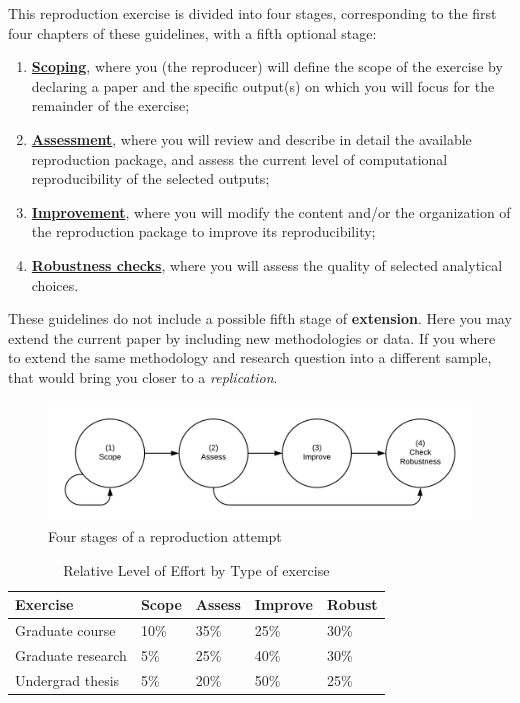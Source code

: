 \documentclass[]{book}
\providecommand{\tightlist}{%
  \setlength{\itemsep}{0pt}\setlength{\parskip}{0pt}}
\begin{document}
This reproduction exercise is divided into four stages, corresponding to the first four chapters of these guidelines, with a fifth optional stage:

\begin{enumerate}
\def\labelenumi{\arabic{enumi}.}
\tightlist
\item
  \protect\hyperlink{scoping}{\textbf{Scoping}}, where you (the reproducer) will define the scope of the exercise by declaring a paper and the specific output(s) on which you will focus for the remainder of the exercise;\\
\item
  \protect\hyperlink{assessment}{\textbf{Assessment}}, where you will review and describe in detail the available reproduction package, and assess the current level of computational reproducibility of the selected outputs;
\item
  \protect\hyperlink{improvements}{\textbf{Improvement}}, where you will modify the content and/or the organization of the reproduction package to improve its reproducibility;\\
\item
  \protect\hyperlink{robust}{\textbf{Robustness checks}}, where you will assess the quality of selected analytical choices.
\end{enumerate}

These guidelines do not include a possible fifth stage of \textbf{extension}. Here you may extend the current paper by including new methodologies or data. If you where to extend the same methodology and research question into a different sample, that would bring you closer to a \emph{replication}.

\begin{figure}
\includegraphics[width=1\linewidth]{stages} \caption{Four stages of a reproduction attempt}\label{fig:stages-intro}
\end{figure}
\begin{table}

\caption{\label{tab:stages-intro}Relative Level of Effort by Type of exercise}
\centering
\begin{tabu} to 
\hline
Exercise & Scope & Assess & Improve & Robust\\
\hline
Graduate course & 10\% & 35\% & 25\% & 30\%\\
\hline
Graduate research & 5\% & 25\% & 40\% & 30\%\\
\hline
Undergrad thesis & 5\% & 20\% & 50\% & 25\%\\
\hline
\end{tabu}
\end{table}
\end{document}
